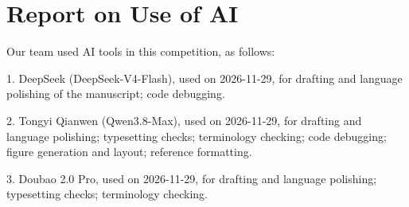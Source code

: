 \clearpage
{}
\section*{Report on Use of AI}
Our team used AI tools in this competition, as follows:

1. DeepSeek (DeepSeek-V4-Flash)\cite{deepseek2026}, used on 2026-11-29, for drafting and language polishing of the manuscript; code debugging.

2. Tongyi Qianwen (Qwen3.8-Max)\cite{qwen2026}, used on 2026-11-29, for drafting and language polishing; typesetting checks; terminology checking; code debugging; figure generation and layout; reference formatting.

3. Doubao 2.0 Pro\cite{doubao2026}, used on 2026-11-29, for drafting and language polishing; typesetting checks; terminology checking.

\clearpage
